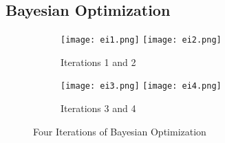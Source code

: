 \begin{appendices}

\chapter{Bayesian Optimization}

\begin{sidewaysfigure}[h]
\begin{subfigure}{\textwidth}
\texttt{[image: ei1.png]}\hfill
\texttt{[image: ei2.png]}
\caption{Iterations 1 and 2}
\end{subfigure}
\par\medskip
\begin{subfigure}{\textwidth}
\texttt{[image: ei3.png]}\hfill
\texttt{[image: ei4.png]}
\caption{Iterations 3 and 4}
\end{subfigure}
\caption{Four Iterations of Bayesian Optimization}
\label{fig:ei}
\end{sidewaysfigure}


\end{appendices}
